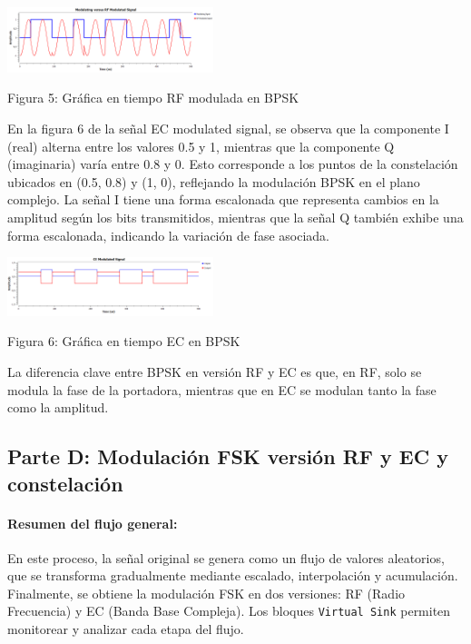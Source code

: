 \documentclass{journal}[IEEEtran, twocolumn]             %
\begin{document}
\begin{multicols}{2}
{ \begin{center}
        \includegraphics[width=0.45\textwidth]{figs/F5.png}
        \caption{Figura 5: Gráfica en tiempo RF modulada en BPSK}
        \label{fig:5}
    \end{center}
    
    
En la figura 6 de la señal EC modulated signal, se observa que la componente I (real) alterna entre los valores 0.5 y 1, mientras que la componente Q (imaginaria) varía entre 0.8 y 0. Esto corresponde a los puntos de la constelación ubicados en (0.5, 0.8) y (1, 0), reflejando la modulación BPSK en el plano complejo. La señal I tiene una forma escalonada que representa cambios en la amplitud según los bits transmitidos, mientras que la señal Q también exhibe una forma escalonada, indicando la variación de fase asociada.


 \begin{center}
        \includegraphics[width=0.45\textwidth]{figs/F6.png}
        \caption{Figura 6: Gráfica en tiempo EC en BPSK}
        \label{fig:6}
    \end{center}
    
La diferencia clave entre BPSK en versión RF y EC es que, en RF, solo se modula la fase de la portadora, mientras que en EC se modulan tanto la fase como la amplitud.\cite{libro1}


\subsection{Parte D: Modulación FSK versión RF y EC y constelación}

\paragraph{Resumen del flujo general:}
En este proceso, la señal original se genera como un flujo de valores aleatorios, que se transforma gradualmente mediante escalado, interpolación y acumulación. Finalmente, se obtiene la modulación FSK en dos versiones: RF (Radio Frecuencia) y EC (Banda Base Compleja). Los bloques \texttt{Virtual Sink} permiten monitorear y analizar cada etapa del flujo.
}
\end{multicols}
\end{document}
